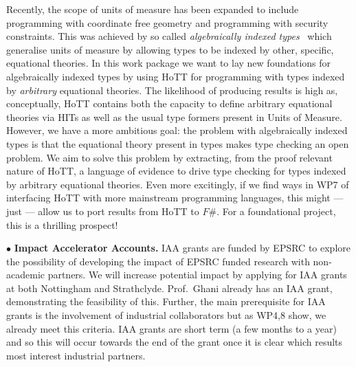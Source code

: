 \documentclass[a4paper,11pt]{article}
\begin{document}
Recently, the scope of units of measure has been expanded to include
programming with coordinate free geometry and programming with
security constraints. This was achieved by so called {\em
  algebraically indexed types}~\cite{ajk} which generalise units of
measure by allowing types to be indexed by other, specific, equational
theories. In this work package we want to lay new foundations for
algebraically indexed types by using HoTT for programming with types
indexed by {\em arbitrary} equational theories. The likelihood of
producing results is high as, conceptually, HoTT contains both the
capacity to define arbitrary equational theories via HITs as well as
the usual type formers present in Units of Measure. However, we have a
more ambitious goal: the problem with algebraically indexed types is
that the equational theory present in types makes type checking an
open problem. We aim to solve this problem by extracting, from the proof
relevant nature of HoTT, a language of evidence to drive type checking
for types indexed by arbitrary equational theories. Even more
excitingly, if we find ways in WP7 of interfacing HoTT with more
mainstream programming languages, this might --- just --- allow us to port
results from HoTT to $F\#$.  For a foundational project, this is a
thrilling prospect!


\vspace*{0.02in}

$\bullet$ {\bf Impact Accelerator Accounts.} IAA grants are funded by
EPSRC to explore the possibility of developing the impact of EPSRC
funded research with non-academic partners. We will increase potential
impact by applying for IAA grants at both Nottingham and
Strathclyde. Prof.\ Ghani already has an IAA grant, demonstrating the
feasibility of this. Further, the main prerequisite for IAA grants is
the involvement of industrial collaborators but as WP4,8 show, we
already meet this criteria. IAA grants are short term (a few months to
a year) and so this will occur towards the end of the grant once it is
clear which results most interest industrial partners.

\vspace*{0.02in}
\end{document}
